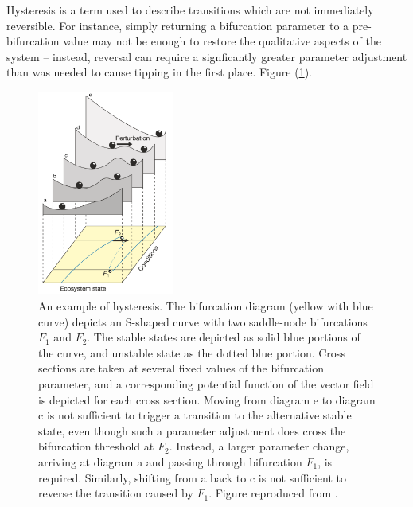 Hysteresis is a term used to describe transitions which are not immediately reversible. For instance, simply returning a bifurcation parameter to a pre-bifurcation value may not be enough to restore the qualitative aspects of the system -- instead, reversal can require a signficantly greater parameter adjustment than was needed to cause tipping in the first place. Figure (\ref{fig:hysteresis}).

\begin{figure}[ht]
	\centering
	\captionsetup{width=0.9\linewidth}
	\includegraphics[width=0.4\textwidth]{figs/hysteresis}
	\caption{An example of hysteresis. The bifurcation diagram (yellow with blue curve) depicts an S-shaped curve with two saddle-node bifurcations $F_1$ and $F_2$. The stable states are depicted as solid blue portions of the curve, and unstable state as the dotted blue portion. Cross sections are taken at several fixed values of the bifurcation parameter, and a corresponding potential function of the vector field is depicted for each cross section. Moving from diagram e to diagram c is not sufficient to trigger a transition to the alternative stable state, even though such a parameter adjustment does cross the bifurcation threshold at $F_2$. Instead, a larger parameter change, arriving at diagram a and passing through bifurcation $F_1$, is required. Similarly, shifting from a back to c is not sufficient to reverse the transition caused by $F_1$. 
		Figure reproduced from \cite{schefferCatastrophicShiftsEcosystems2001}.}
	
	\label{fig:hysteresis}
\end{figure} 


